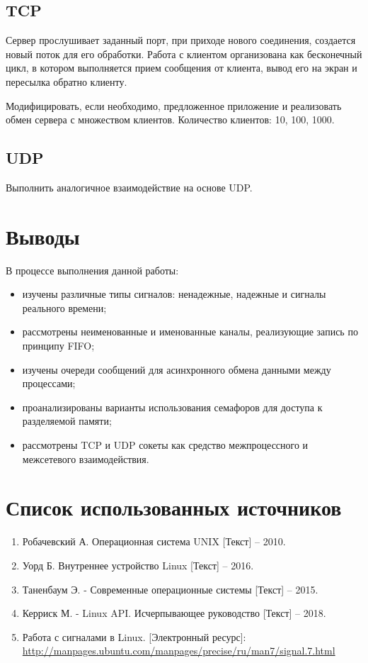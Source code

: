 \subsection{TCP}

Сервер прослушивает заданный порт, при приходе нового соединения, создается новый поток для его обработки. Работа с клиентом организована как бесконечный цикл, в котором выполняется прием сообщения от клиента, вывод его на экран и пересылка обратно клиенту.

Модифицировать, если необходимо, предложенное приложение и реализовать обмен сервера с множеством клиентов. Количество клиентов: 10, 100, 1000.

\subsection{UDP}

Выполнить аналогичное взаимодействие на основе UDP.

\section{Выводы}

В процессе выполнения данной работы:

\begin{itemize}
	\item изучены различные типы сигналов: ненадежные, надежные и сигналы реального времени;
	\item рассмотрены неименованные и именованные каналы, реализующие запись по принципу FIFO;
	\item изучены очереди сообщений для асинхронного обмена данными между процессами;
	\item проанализированы варианты использования семафоров для доступа к разделяемой памяти;
	\item рассмотрены TCP и UDP сокеты как средство межпроцессного и межсетевого взаимодействия.
\end{itemize}

\section*{Список использованных источников}

\begin{enumerate}
	\item Робачевский А. Операционная система UNIX [Текст] -- 2010.
	\item Уорд Б. Внутреннее устройство Linux [Текст] -- 2016.
	\item Таненбаум Э. - Современные операционные системы [Текст] -- 2015.
	\item Керриск М. - Linux API. Исчерпывающее руководство [Текст] -- 2018.
	\item Работа с сигналами в Linux. [Электронный ресурс]:\\
		{\small\url{http://manpages.ubuntu.com/manpages/precise/ru/man7/signal.7.html}} 
\end{enumerate}


